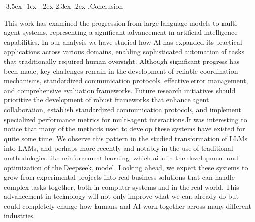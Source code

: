 \documentclass[journal,twoside,10pt]{IEEEtran}
\makeatletter
\renewcommand\section{\@startsection{section}{1}{\z@}%
                       {-3.5ex \@plus -1ex \@minus -.2ex}%
                       {2.3ex \@plus.2ex}%
                       {\normalfont\Large\bfseries\Roman{section}.\quad}}
\makeatother
\begin{document}
\section{Conclusion}

This work has examined the progression from large language models to multi-agent systems, representing a significant advancement in artificial intelligence capabilities. In our analysis we have studied how AI has expanded its practical applications across various domains, enabling sophisticated automation of tasks that traditionally required human oversight. Although significant progress has been made, key challenges remain in the development of reliable coordination mechanisms, standardized communication protocols, effective error management, and comprehensive evaluation frameworks. 
Future research initiatives should prioritize the development of robust frameworks that enhance agent collaboration, establish standardized communication protocols, and implement specialized performance metrics for multi-agent interactions.It was interesting to notice that many of the methods used to develop these systems have existed for quite some time. We observe this pattern in the studied transformation of LLMs into LAMs, and perhaps more recently and notably in the use of traditional methodologies like reinforcement learning, which aids in the development and optimization of the Deepseek, \cite{liu2024deepseekv3} model.
Looking ahead, we expect these systems to grow from experimental projects into real business solutions that can handle complex tasks together, both in computer systems and in the real world. This advancement in technology will not only improve what we can already do but could completely change how humans and AI work together across many different industries.




 
\end{document}
